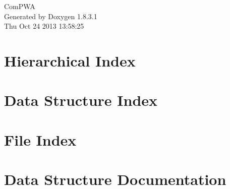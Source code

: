 \documentclass{book}
\begin{document}
\hypersetup{pageanchor=false,citecolor=blue}
\begin{titlepage}
\vspace*{7cm}
\begin{center}
{\Large Com\-P\-W\-A }\\
\vspace*{1cm}
{\large Generated by Doxygen 1.8.3.1}\\
\vspace*{0.5cm}
{\small Thu Oct 24 2013 13:58:25}\\
\end{center}
\end{titlepage}
\clearemptydoublepage
{}
\tableofcontents
\clearemptydoublepage
{}
\hypersetup{pageanchor=true,citecolor=blue}
\chapter{Hierarchical Index}

\chapter{Data Structure Index}

\chapter{File Index}

\chapter{Data Structure Documentation}



















































\end{document}
